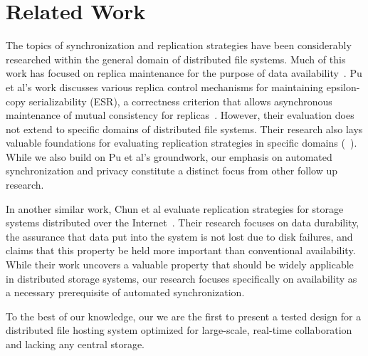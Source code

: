 \section{Related Work}
\label{related}
The topics of synchronization and replication strategies have been considerably researched
within the general domain of distributed file systems.
Much of this work has focused on replica maintenance for the purpose of data availability~\cite{pu1991replica,damani1999optimistic,goel2006data,chun2006replica,ford2010availability}.
Pu et al's work discusses various replica control mechanisms for maintaining epsilon-copy serializability (ESR), 
a correctness criterion that allows asynchronous maintenance of mutual consistency for replicas~\cite{pu1991replica}. 
However, their evaluation does not extend to specific domains of distributed file systems.
Their research also lays valuable foundations for evaluating replication strategies in specific domains (\ie~\cite{ford2010availability}). 
While we also build on Pu et al's groundwork, our emphasis on automated synchronization and privacy constitute a distinct focus from other follow up research.

In another similar work, Chun et al evaluate replication strategies for storage systems distributed over the Internet~\cite{chun2006replica}.
Their research focuses on data durability, the assurance that data put into the system is not lost due to disk failures, and claims that this property be held more important than conventional availability.
While their work uncovers a valuable property that should be widely applicable in distributed storage systems,
our research focuses specifically on availability as a necessary prerequisite of automated synchronization.

To the best of our knowledge, our we are the first to present a tested design for a distributed file 
hosting system optimized for large-scale, real-time collaboration and lacking any central storage.
